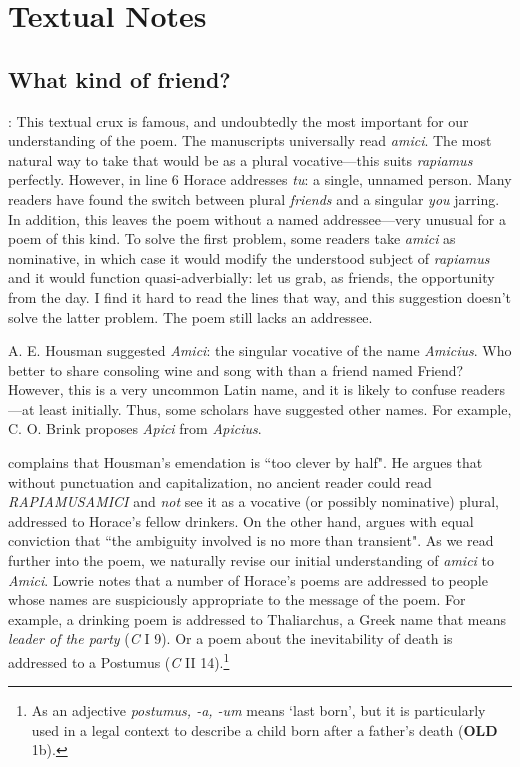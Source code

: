 \chapter*{Textual Notes}

\section*{What kind of friend?}


: This textual crux is famous, and undoubtedly the most important for our understanding of the poem.  The manuscripts universally read \textit{amici}.  The most natural way to take that would be as a plural vocative---this suits \textit{rapiamus} perfectly.  However, in line 6 Horace addresses \textit{tu}: a single, unnamed person.  Many readers have found the switch between plural \textit{friends} and a singular \textit{you} jarring.  In addition, this leaves the poem without a named addressee---very unusual for a poem of this kind.  To solve the first problem, some readers take \textit{amici} as nominative, in which case it would modify the understood subject of \textit{rapiamus} and it would function quasi-adverbially: let us grab, as friends, the opportunity from the day.  I find it hard to read the lines that way, and this suggestion doesn't solve the latter problem.  The poem still lacks an addressee.

A. E. Housman suggested \textit{Amici}: the singular vocative of the name \textit{Amicius}.  Who better to share consoling wine and song with than a friend named Friend?  However, this is a very uncommon Latin name, and it is likely to confuse readers---at least initially.  Thus, some scholars have suggested other names.  For example, C. O. Brink proposes \textit{Apici} from \textit{Apicius}.

\citet[205]{gaskin2013} complains that Housman's emendation is ``too clever by half".  He argues that without punctuation and capitalization, no ancient reader could read \textit{RAPIAMUSAMICI} and \textit{not} see it as a vocative (or possibly nominative) plural, addressed to Horace's fellow drinkers.  On the other hand, \citet[417, note 14]{lowrie1992} argues with equal conviction that ``the ambiguity involved is no more than transient".  As we read further into the poem, we naturally revise our initial understanding of \textit{amici} to \textit{Amici}.  Lowrie notes that a number of Horace's poems are addressed to people whose names are suspiciously appropriate to the message of the poem.  For example,  a drinking poem is addressed to Thaliarchus, a Greek name that means \textit{leader of the party} (\textit{C} I 9).  Or a poem about the inevitability of death is addressed to a Postumus (\textit{C} II 14).\footnote{As an adjective \textit{postumus, -a, -um} means `last born', but it is particularly used in a legal context to describe a child born after a father's death (\textbf{OLD} 1b).}

